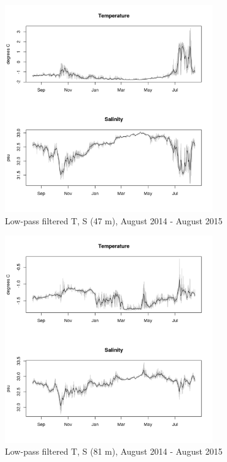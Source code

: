 \documentclass[12pt]{dforeport}
\begin{document}
\begin{figure}  
\centering
\includegraphics[width = 0.8\textwidth]{./figures/29_lpf_TS_47m_2014_2015.png}
\caption[Low-pass filtered T, S (47 m), 2014-2015]{Low-pass filtered T, S (47 m), August 2014 - August 2015}
\label{f:ctd_47_lpf_2014_2015}
\end{figure}

\begin{figure}  
\centering
\includegraphics[width = 0.8\textwidth]{./figures/30_lpf_TS_81m_2014_2015.png}
\caption[Low-pass filtered T, S (81 m), 2014-2015]{Low-pass filtered T, S (81 m), August 2014 - August 2015}
\label{f:ctd_81_lpf_2014_2015}
\end{figure}
\end{document}
